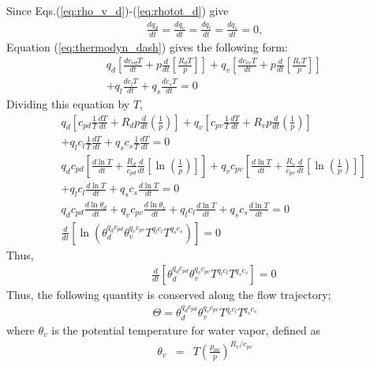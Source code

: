 Since Eqs.(\ref{eq:rho_v_d})-(\ref{eq:rhotot_d}) give
\begin{eqnarray}
  \frac{d q_d}{dt} = \frac{d q_v}{dt} = \frac{d q_l}{dt} = \frac{d q_s}{dt} = 0,
\end{eqnarray}
Equation (\ref{eq:thermodyn_dash}) gives the following form:
\begin{eqnarray}
&& q_d  \left[\frac{d  c_{vd}   T}{dt} +  p \frac{d}{dt} \left[\frac{ R_d T}{p}\right]\right]
+q_v \left[\frac{d  c_{vv}   T}{dt} + p \frac{d}{dt} \left[\frac{ R_v T}{p}\right]\right]\nonumber\\
&&+ q_l  \frac{d  c_{l}   T}{dt} + q_s  \frac{d  c_{s}   T}{dt} =0
\end{eqnarray}
Dividing this equation by $T$,
\begin{eqnarray}
&&q_d  \left[c_{pd} \frac{1}{T}\frac{d T}{dt} 
+  R_d p \frac{d}{dt} \left(\frac{1}{p}\right)\right]
+q_v  \left[c_{pv} \frac{1}{T}\frac{d T}{dt} 
+  R_v p \frac{d}{dt} \left(\frac{1}{p}\right)\right]\nonumber\\
&&+ q_l c_{l} \frac{1}{T}  \frac{d   T}{dt}
  + q_s c_{s} \frac{1}{T}  \frac{d   T}{dt} =0\\
&&q_d c_{pd} \left[ \frac{d \ln T}{dt} 
+  \frac{R_d}{c_{pd}} \frac{d}{dt} \left[\ln \left(\frac{1}{p}\right)\right]\right]
+q_v c_{pv}  \left[\frac{d \ln T}{dt} 
+  \frac{R_v}{c_{pv}} \frac{d}{dt} \left[\ln \left(\frac{1}{p}\right)\right]\right]\nonumber\\
&&+ q_l c_{l}  \frac{d \ln T}{dt}
  + q_s c_{s}  \frac{d \ln T}{dt} =0 \label{eq:thermdyn2}\\
&&
 q_d c_{pd} \frac{d \ln \theta_d}{dt}
+q_v c_{pv} \frac{d \ln \theta_v}{dt}
+q_l c_l   \frac{d \ln T}{dt}
+q_s c_s   \frac{d  \ln T}{dt}=0\\
&&
\frac{d}{dt}\left[ \ln \left( 
\theta_d^{q_d c_{pd}} \theta_v^{q_v c_{pv}} T^{q_l c_l} T^{q_s c_s}
\right)\right] = 0 \label{eq:lnThetaconserveation}
\end{eqnarray}
Thus,
\begin{eqnarray}
&&\frac{d}{dt}\left[ 
\theta_d^{q_d c_{pd}} \theta_v^{q_v c_{pv}} T^{q_l c_l} T^{q_s c_s}
\right] = 0
\end{eqnarray}
Thus, the following quantity is conserved along the flow trajectory;
\begin{eqnarray}
\Theta = \theta_d^{q_d c_{pd}} \theta_v^{q_v c_{pv}} T^{q_l c_l} T^{q_s c_s}
\end{eqnarray}
where $\theta_v$ is the potential temperature for water vapor, defined as
\begin{eqnarray}
\theta_v &=& T \left(\frac{p_{00}}{p}\right)^{R_v/c_{pv}}
\end{eqnarray}

